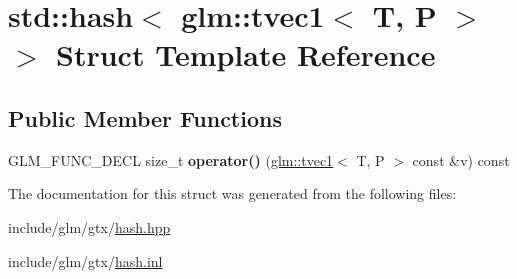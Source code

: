 \hypertarget{structstd_1_1hash_3_01glm_1_1tvec1_3_01T_00_01P_01_4_01_4}{}\section{std\+:\+:hash$<$ glm\+:\+:tvec1$<$ T, P $>$ $>$ Struct Template Reference}
\label{structstd_1_1hash_3_01glm_1_1tvec1_3_01T_00_01P_01_4_01_4}
\subsection*{Public Member Functions}
\begin{DoxyCompactItemize}
\item 
\mbox{\label{structstd_1_1hash_3_01glm_1_1tvec1_3_01T_00_01P_01_4_01_4_af9292500982d527b901c6bc850b075b9}} 
G\+L\+M\+\_\+\+F\+U\+N\+C\+\_\+\+D\+E\+CL size\+\_\+t {\bfseries operator()} (\hyperlink{structglm_1_1tvec1}{glm\+::tvec1}$<$ T, P $>$ const \&v) const
\end{DoxyCompactItemize}


The documentation for this struct was generated from the following files\+:\begin{DoxyCompactItemize}
\item 
include/glm/gtx/\hyperlink{hash_8hpp}{hash.\+hpp}\item 
include/glm/gtx/\hyperlink{hash_8inl}{hash.\+inl}\end{DoxyCompactItemize}
